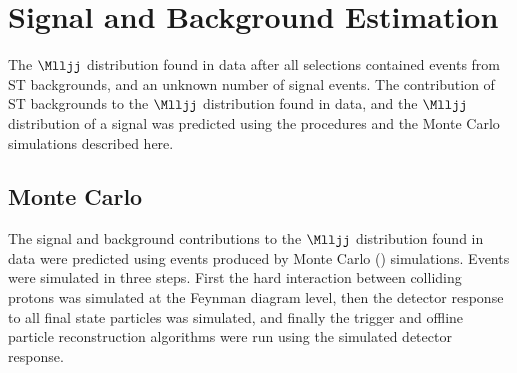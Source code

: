 \chapter{Signal and Background Estimation}
\label{sec:backgroundEstimation}
The $\Mlljj$ distribution found in data after all selections contained events from ST backgrounds, and an unknown 
number of \WR signal events.  The contribution of ST backgrounds to the $\Mlljj$ distribution found in data, and the 
$\Mlljj$ distribution of a \WR signal was predicted using the procedures and the Monte Carlo simulations described here.


\section{Monte Carlo}
\label{sec:MC}
The signal and background contributions to the $\Mlljj$ distribution found in data were predicted using events produced 
by Monte Carlo (\MC) simulations.  Events were simulated in three steps.  First the hard interaction between colliding 
protons was simulated at the Feynman diagram level, then the detector response to all final state particles was 
simulated, and finally the trigger and offline particle reconstruction algorithms were run using the simulated detector 
response.

